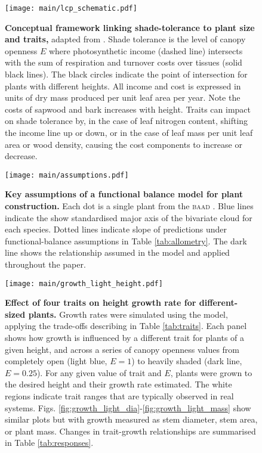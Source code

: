 \documentclass[a4paper,11pt]{article}
\begin{document}
\newpage

\begin{figure}[ht]
\centering
\texttt{[image: main/lcp\_schematic.pdf]}
\caption{\textbf{Conceptual framework linking shade-tolerance to plant size and traits,}
adapted from \citet{Givnish-1988}.
Shade tolerance is the level of canopy openness $E$ where photosynthetic income (dashed line) intersects with the sum of respiration and turnover costs over tissues (solid black lines). The black circles indicate the point of intersection for plants with different heights. All income and cost is expressed in units of dry mass produced  per unit leaf area per year. Note the costs of sapwood and bark increases with height.
Traits can impact on shade tolerance by, in the case of leaf nitrogen content, shifting the income line up or down, or in the case of leaf mass per unit leaf area or wood density, causing the cost components to increase or decrease.
\label{fig:wplcp_idea}}
\end{figure}

\newpage

\begin{figure}[ht]
\centering
\texttt{[image: main/assumptions.pdf]}
\caption{\textbf{Key assumptions of a functional balance model for plant construction.}
Each dot is a single plant from the \textsc{baad} \citep{Falster-2015b}.
Blue lines indicate the show standardised major axis of the bivariate cloud for each species. Dotted lines indicate slope of predictions under functional-balance assumptions in Table \ref{tab:allometry}. The dark line shows the relationship assumed in the {\plant} model and applied throughout the paper.
\label{fig:assumptions}}
\end{figure}

\newpage

\begin{figure}[ht]
\centering
\texttt{[image: main/growth\_light\_height.pdf]}
\caption{\textbf{Effect of four traits on height growth rate for different-sized plants.}
Growth rates were simulated using the {\plant} model, applying the trade-offs describing in Table \ref{tab:traits}. Each panel shows how growth is influenced by a different trait for plants of a given height, and across a series of canopy openness values from completely open (light blue,  $E=1$) to heavily shaded (dark line, $E=0.25$). For any given value of trait and $E$, plants were grown to the desired height and their growth rate estimated. The white regions indicate trait ranges that are typically observed in real systems. Figs. \ref{fig:growth_light_dia}-\ref{fig:growth_light_mass} show similar plots but with growth measured as stem diameter, stem area, or plant mass. Changes in trait-growth relationships are summarised in Table \ref{tab:responses}.
\label{fig:growth_light_height}}
\end{figure}
\end{document}
